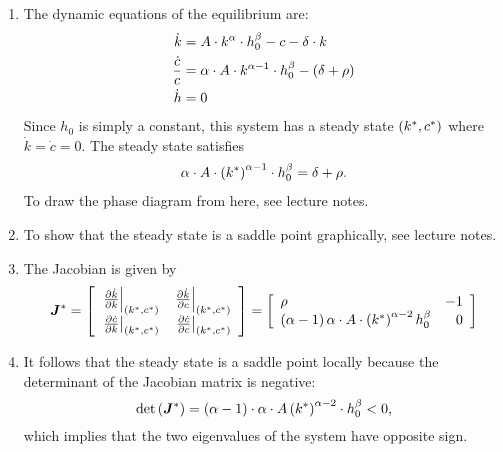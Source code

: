 \documentclass[letterpaper,12pt,leqno]{article}
\begin{document}
\begin{enumerate}
\item The dynamic equations of the equilibrium are:
\begin{align*}
\dot{k} &=A\cdot k^{\alpha}\cdot h_{0}^{\beta}-c-\delta \cdot k \\
\frac{\dot{c}}{c} &=\alpha\cdot A\cdot k^{\alpha -1}\cdot h_{0}^{\beta}-\left( \delta +\rho \right) \\
\dot{h} &=0
\end{align*}
Since $h_{0}$ is simply a constant, this system has a steady state $\left( k^*,c^* \right) $ where $\dot{k}=\dot{c}=0$. The steady state satisfies 
\begin{align*}
\alpha\cdot A\cdot \left( k^* \right)^{\alpha -1}\cdot h_{0}^{\beta}=\delta +\rho.
\end{align*}
To draw the phase diagram from here, see lecture notes.
\item To show that the steady state is a saddle point graphically, see lecture notes.
\item The Jacobian is given by
\begin{align*}
\bm{J}^{*}=\left[ 
\begin{array}{lr}
\left.\frac{\partial \dot{k}}{\partial k}\right\vert_{(k^{*},c^{*})}  & \left.\frac{\partial \dot{k}}{\partial c}\right\vert_{(k^{*},c^{*})} \\ 
\left.\frac{\partial \dot{c}}{\partial k}\right\vert_{(k^{*},c^{*})} & \left.\frac{\partial \dot{c}}{\partial c}\right\vert_{(k^{*},c^{*})}
\end{array} \right]=\left[ 
\begin{array}{lr}
\rho  & -1 \\ 
\left( \alpha -1 \right) \alpha\cdot A\cdot \left( k^* \right) ^{\alpha-2}h_{0}^{\beta} & 0
\end{array} \right]
\end{align*}
\item It follows that the steady state is a saddle point locally because the determinant of the Jacobian matrix is negative: \[\det \left( \bm{J}^{*} \right) =\left( \alpha-1 \right)\cdot  \alpha\cdot A\left( k^* \right)^{\alpha-2}\cdot h_{0}^{\beta}<0,\] 
which implies that the two eigenvalues of the system have opposite sign. 
\end{enumerate}
\end{document}
